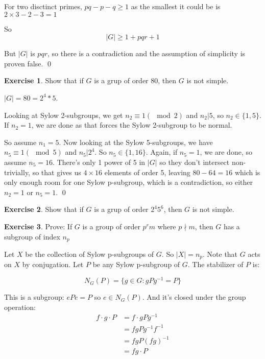 \documentclass[11pt,oneside]{article}
\numberwithin{equation}{section}
\theoremstyle{definition}
\newtheorem{exercise}{Exercise}
\begin{document}
\begin{solution}
\begin{enumerate}[(a)]
    For two disctinct primes, $pq -p -q \geq 1$ as the smallest it could be is $2 \times 3 - 2 - 3 = 1$

    So
    \[
    |G| \geq 1 + pqr + 1
    \]

    But $|G|$ is $pqr$, so there is a contradiction and the assumption of simplicity is proven false.
    \qed
  \end{enumerate}
\end{solution}
\begin{exercise}
  Show that if $G$ is a grup of order 80, then $G$ is not simple.  
\end{exercise}

\begin{solution}
  $|G| = 80 = 2^4 * 5$.

  Looking at Sylow 2-subgroups, we get $n_2 \equiv 1 ( \mod 2)$ and $ n_2 | 5$, so
  $n_2 \in \{ 1, 5\}$.  If $n_2 = 1$, we are done as that forces the Sylow 2-subgroup
  to be normal.

  So assume $n_1 = 5$.  Now looking at the Sylow 5-subgroups, we have $n_5  \equiv 1 (\mod 5)$
  and $n_5 | 2^4$.  So $n_5 \in \{1, 16\} $.  Again, if $n_5 = 1$, we are done, so assume
  $n_5 = 16$.  There's only 1 power of 5 in $|G|$ so they don't intersect non-trivially, so
  that gives us $4 \times 16$  elements of order 5, leaving $80 - 64 = 16$ which is only
  enough room for one Sylow p-subgroup, which is a contradiction, so either $n_2 = 1$ or $n_5 = 1$.
  \qed
  
\end{solution}

\begin{exercise}
  Show that if $G$ is a grup of order $2^4 5^6$, then $G$ is not simple.  
\end{exercise}

\begin{exercise}
  Prove: If $G$ is a group of order $p^r m$ where $ p \nmid m$, then $G$ has a subgroup
  of index $n_p$
\end{exercise}

\begin{solution}
  Let $X$ be the collection of Sylow p-subgroups of $G$.  So $|X| = n_p$.  Note that $G$ acts on $X$
  by conjugation.  Let $P$ be any Sylow p-subgroup of $G$.  The stabilizer of $P$ is:

  \[
  N_G(P) = \{ g \in G : gPg^{-1} = P \}
  \]

  This is a subgroup: $ ePe = P$ so $e \in N_G(P)$.  And it's closed under the group operation:
  \begin{align*}
    f \cdot g \cdot P &= f \cdot gPg^{-1} \\
    &= fgPg^{-1}f^{-1}  \\
    &= fgP(fg)^{-1}  \\
    &= fg \cdot P
  \end{align*}
\end{solution}
\end{document}
